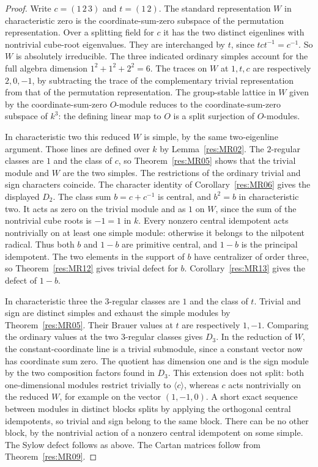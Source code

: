 \documentclass[11pt,oneside,openany]{book}
\theoremstyle{definition}
\theoremstyle{remark}
\begin{document}
\begin{proof}
Write \(c=(1\,2\,3)\) and \(t=(1\,2)\). The standard
representation \(W\) in characteristic zero is the
coordinate-sum-zero subspace of the permutation representation.
Over a splitting field for \(c\) it has the two distinct
eigenlines with nontrivial cube-root eigenvalues. They are
interchanged by \(t\), since \(tct^{-1}=c^{-1}\).
So \(W\) is absolutely irreducible. The three indicated
ordinary simples account for the full algebra dimension
\(1^2+1^2+2^2=6\). The traces on \(W\) at \(1,t,c\) are
respectively \(2,0,-1\), by subtracting the trace of the
complementary trivial representation from that of the permutation
representation. The group-stable lattice in \(W\) given by
the coordinate-sum-zero \(O\)-module reduces to the
coordinate-sum-zero subspace of \(k^3\): the defining linear map
to \(O\) is a split surjection of \(O\)-modules.

In characteristic two this reduced \(W\) is simple, by the
same two-eigenline argument. Those lines are defined over \(k\)
by Lemma~\ref{res:MR02}. The \(2\)-regular classes are \(1\)
and the class of \(c\), so Theorem~\ref{res:MR05} shows that
the trivial module and \(W\) are the two simples. The restrictions
of the ordinary trivial and sign characters coincide.
The character identity of Corollary~\ref{res:MR06} gives
the displayed \(D_2\). The class sum \(b=c+c^{-1}\) is central,
and \(b^2=b\) in characteristic two. It acts as zero on the
trivial module and as \(1\) on \(W\), since the sum of the
nontrivial cube roots is \(-1=1\) in \(k\).
Every nonzero central idempotent acts nontrivially on at least
one simple module: otherwise it belongs to the nilpotent
radical. Thus both \(b\) and \(1-b\) are primitive central,
and \(1-b\) is the principal idempotent.
The two elements in the support of \(b\) have centralizer
of order three, so Theorem~\ref{res:MR12} gives trivial
defect for \(b\). Corollary~\ref{res:MR13} gives the
defect of \(1-b\).

In characteristic three the \(3\)-regular classes are \(1\)
and the class of \(t\). Trivial and sign are distinct simples
and exhaust the simple modules by Theorem~\ref{res:MR05}.
Their Brauer values at \(t\) are respectively \(1,-1\).
Comparing the ordinary values at the two \(3\)-regular
classes gives \(D_3\). In the reduction of \(W\), the
constant-coordinate line is a trivial submodule, since a
constant vector now has coordinate sum zero. The quotient
has dimension one and is the sign module by the two
composition factors found in \(D_3\).
This extension does not split: both one-dimensional modules
restrict trivially to \(\langle c\rangle\), whereas \(c\)
acts nontrivially on the reduced \(W\), for example on the
vector \((1,-1,0)\). A short exact sequence between modules
in distinct blocks splits by applying the orthogonal central
idempotents, so trivial and sign belong to the same block.
There can be no other block, by the nontrivial action of
a nonzero central idempotent on some simple. The Sylow
defect follows as above.
The Cartan matrices follow from Theorem~\ref{res:MR09}.
\end{proof}
\end{document}

